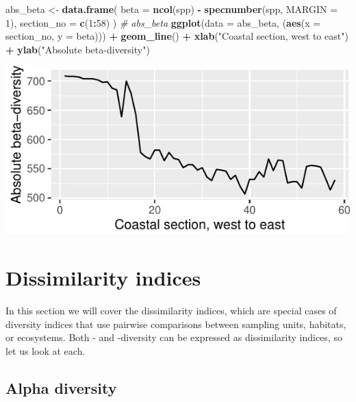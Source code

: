 \documentclass[10pt,a4,]{article}
\newenvironment{Shaded}{\begin{snugshade}}{\end{snugshade}}
\newcommand{\CommentTok}[1]{\textcolor[rgb]{0.56,0.35,0.01}{\textit{#1}}}
\newcommand{\DataTypeTok}[1]{\textcolor[rgb]{0.13,0.29,0.53}{#1}}
\newcommand{\DecValTok}[1]{\textcolor[rgb]{0.00,0.00,0.81}{#1}}
\newcommand{\KeywordTok}[1]{\textcolor[rgb]{0.13,0.29,0.53}{\textbf{#1}}}
\newcommand{\NormalTok}[1]{#1}
\newcommand{\OperatorTok}[1]{\textcolor[rgb]{0.81,0.36,0.00}{\textbf{#1}}}
\newcommand{\StringTok}[1]{\textcolor[rgb]{0.31,0.60,0.02}{#1}}
\begin{document}
\begin{Shaded}
\begin{Highlighting}[]
\NormalTok{abs\_beta <{-}}\StringTok{ }\KeywordTok{data.frame}\NormalTok{(}
  \DataTypeTok{beta =} \KeywordTok{ncol}\NormalTok{(spp) }\OperatorTok{{-}}\StringTok{ }\KeywordTok{specnumber}\NormalTok{(spp, }\DataTypeTok{MARGIN =} \DecValTok{1}\NormalTok{),}
  \DataTypeTok{section\_no =} \KeywordTok{c}\NormalTok{(}\DecValTok{1}\OperatorTok{:}\DecValTok{58}\NormalTok{)}
\NormalTok{)}
\CommentTok{\# abs\_beta}
\KeywordTok{ggplot}\NormalTok{(}\DataTypeTok{data =}\NormalTok{ abs\_beta, (}\KeywordTok{aes}\NormalTok{(}\DataTypeTok{x =}\NormalTok{ section\_no, }\DataTypeTok{y =}\NormalTok{ beta))) }\OperatorTok{+}
\StringTok{  }\KeywordTok{geom\_line}\NormalTok{() }\OperatorTok{+}\StringTok{ }\KeywordTok{xlab}\NormalTok{(}\StringTok{"Coastal section, west to east"}\NormalTok{) }\OperatorTok{+}\StringTok{ }\KeywordTok{ylab}\NormalTok{(}\StringTok{"Absolute beta{-}diversity"}\NormalTok{)}
\end{Highlighting}
\end{Shaded}

\begin{center}\includegraphics{compliled_figures/unnamed-chunk-9-1} \end{center}

\section{Dissimilarity indices}

In this section we will cover the dissimilarity indices, which are
special cases of diversity indices that use pairwise comparisons between
sampling units, habitats, or ecosystems. Both \textalpha- and
\textbeta-diversity can be expressed as dissimilarity indices, so let us
look at each.

\subsection{Alpha diversity}
\end{document}
